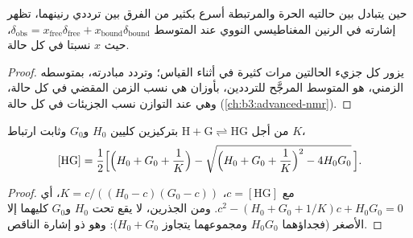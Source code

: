 \begin{proposition}\label{prop:b3:supramolecular:fast-exchange}
حين يتبادل  بين حالتيه الحرة والمرتبطة أسرع بكثير من
الفرق بين ترددي رنينهما، تظهر إشارته في الرنين المغناطيسي النووي عند المتوسط
$\delta_{\mathrm{obs}} = x_{\mathrm{free}}\delta_{\mathrm{free}} + x_{\mathrm{bound}}\delta_{\mathrm{bound}}$، حيث $x$ نسبتا  في كل حالة.
\end{proposition}

\begin{proof}
يزور كل جزيء  الحالتين مرات كثيرة في أثناء القياس؛ 
وتردد مبادرته، بمتوسطه الزمني، هو المتوسط المرجَّح للترددين، بأوزان
هي نسب الزمن المقضي في كل حالة، وهي عند التوازن
نسب الجزيئات في كل حالة (\cref{ch:b3:advanced-nmr}).
\end{proof}

\begin{theorem}\label{thm:b3:supramolecular:isotherm}
من أجل $\mathrm{H + G \rightleftharpoons HG}$ بتركيزين كليين $H_0$ و$G_0$ وثابت ارتباط $K$،
\[
  [\mathrm{HG}] = \frac{1}{2}\Bigl[\Bigl(H_0 + G_0 + \frac1K\Bigr) - \sqrt{\Bigl(H_0 + G_0 + \frac1K\Bigr)^2 - 4H_0G_0}\,\Bigr].
\]
\end{theorem}

\begin{proof}
مع $c = [\mathrm{HG}]$، $K = c/((H_0 - c)(G_0 - c))$، أي $c^2 - (H_0 + G_0 + 1/K)c + H_0G_0 = 0$. ومن الجذرين،
لا يقع تحت $H_0$ و$G_0$ كليهما إلا الأصغر (فجداؤهما $H_0G_0$ ومجموعهما
يتجاوز $H_0 + G_0$): وهو ذو إشارة الناقص.
\end{proof}

